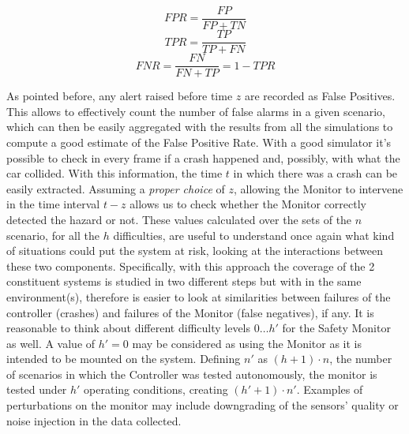 \begin{equation}
	FPR = \frac{FP}{FP+TN}
\end{equation}
\begin{equation}
	TPR = \frac{TP}{TP+FN}
\end{equation}
\begin{equation}
	FNR = \frac{FN}{FN+TP} = 1 - TPR
\end{equation}

As pointed before, any alert raised before time $z$ are recorded as False Positives. This allows to effectively count the number of false alarms in a given scenario, which can then be easily aggregated with the results from all the simulations to compute a good estimate of the False Positive Rate.\newline
With a good simulator it's possible to check in every frame if a crash happened and, possibly, with what the car collided. With this information, the time $t$ in which there was a crash can be easily extracted. Assuming a \textsl{proper choice} of $z$, allowing the Monitor to intervene in the time interval $t-z$ allows us to check whether the Monitor correctly detected the hazard or not.\newline
These values calculated over the sets of the $n$ scenario, for all the $h$ difficulties, are useful to understand once again what kind of situations could put the system at risk, looking at the interactions between these two components. Specifically, with this approach the coverage of the 2 constituent systems is studied in two different steps but with in the same environment(s), therefore is easier to look at similarities between failures of the controller (crashes) and failures of the Monitor (false negatives), if any.\newline\newline
It is reasonable to think about different difficulty levels $0\dots h'$ for the Safety Monitor as well. A value of $h' = 0$ may be considered as using the Monitor as it is intended to be mounted on the system. Defining $n'$ as $(h+1)\cdot n$, the number of scenarios in which the Controller was tested autonomously, the monitor is tested under $h'$ operating conditions, creating $(h' + 1) \cdot n'$. Examples of perturbations on the monitor may include downgrading of the sensors' quality or noise injection in the data collected.\newline\newline
